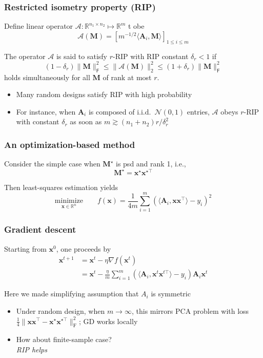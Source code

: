 \documentclass[compress,
mathserif,wide,%
]{beamer}
\begin{document}
\begin{frame}
	\frametitle{Restricted isometry property (RIP)}

Define linear operator $\mathcal{A}: \mathbb{R}^{n_1 \times n_2 } \mapsto \mathbb{R}^{m}$ t obe
\[
\mathcal{A} (\bm{M}) = [ m^{-1/2} \langle \bm{A}_i, \bm{M} \rangle ]_{1 \leq i \leq m}
\]
	\begin{definition}
		The operator $\mathcal{A}$ is said to satisfy $r$-RIP with RIP constant $\delta_{r} < 1$ if 
		\[
		(1 - \delta_{r}) \| \bm{M} \|_{\mathsf{F}}^{2} \leq \|\mathcal{A} (\bm{M}) \|_{2}^{2} \leq (1 + \delta_{r}) \| \bm{M} \|_{\mathsf{F}}^{2}
		\]
		holds simultaneously for all $\bm{M}$ of rank at most $r$.
	\end{definition}

	\begin{itemize}
			\item Many random designs satisfy RIP with high probability
			\item For instance, when $\bm{A}_{i}$ is composed of i.i.d.~$\mathcal{N}(0,1)$ entries, $\mathcal{A}$ obeys $r$-RIP with constant $\delta_{r}$ as soon as $m \gtrsim (n_1 + n_2) r / \delta_{r}^{2}$
	\end{itemize}
\end{frame}

\begin{frame}
	\frametitle{An optimization-based method}
	Consider the simple case when $\bm{M}^\star$ is psd and rank 1, i.e.,
	\[
		\bm{M}^{\star} = \bm{x}^{\star} \bm{x}^{\star \top}
	\]

	\vfill
	Then least-squares estimation yields
	\[
		\underset{\bm{x} \in \mathbb{R}^{n}}{\text{minimize}}\qquad f(\bm{x}) = \frac{1}{4m} \sum_{i=1}^{m} \left( \langle \bm{A}_{i}, \bm{x} \bm{x}^{\top} \rangle - y_i \right)^{2}
	\]

\end{frame}

\begin{frame}
	\frametitle{Gradient descent}
	Starting from $\bm{x}^0$, one proceeds by
	\begin{align*}
		\bm{x}^{t+1} &= \bm{x}^t - \eta \nabla f ( \bm{x}^t ) \\
		&= \bm{x}^t - \frac{\eta}{m} \sum_{i=1}^{m} \left( \langle \bm{A}_{i}, \bm{x}^t \bm{x}^{t\top} \rangle - y_i \right) \bm{A}_{i} \bm{x}^t
	\end{align*}

	Here we made simplifying assumption that $A_{i}$ is symmetric

	\vfill
	\begin{itemize}
			\item Under random design, when $m \to \infty$, this mirrors PCA problem with loss $\frac{1}{4} \| \bm{x} \bm{x}^\top  - \bm{x}^{\star} \bm{x}^{\star \top} \|_{\mathrm{F}}^{2}$; GD works locally
			\item How about finite-sample case? \\
			{\hfill \em \footnotesize RIP helps}
	\end{itemize}
\end{frame}
\end{document}
